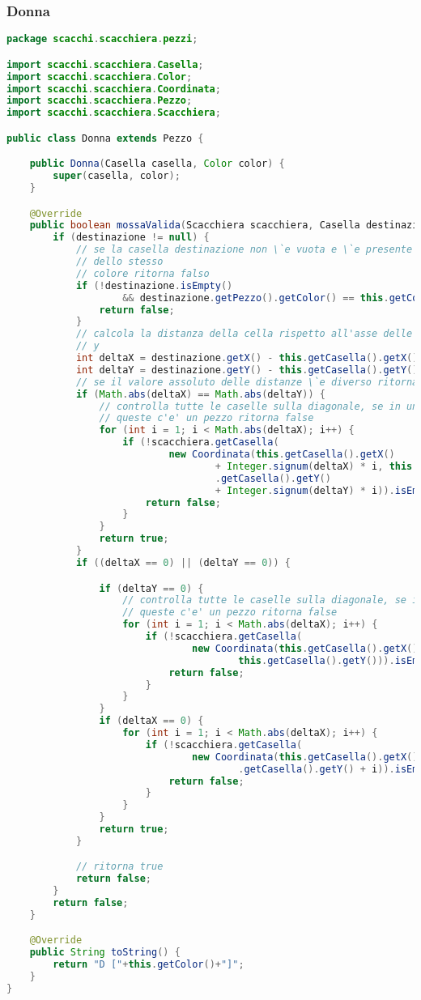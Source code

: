 \documentclass{article}
\begin{document}
\subsubsection{Donna}
\begin{lstlisting}[language=Java,escapechar=|]
package scacchi.scacchiera.pezzi;

import scacchi.scacchiera.Casella;
import scacchi.scacchiera.Color;
import scacchi.scacchiera.Coordinata;
import scacchi.scacchiera.Pezzo;
import scacchi.scacchiera.Scacchiera;

public class Donna extends Pezzo {

	public Donna(Casella casella, Color color) {
		super(casella, color);
	}

	@Override
	public boolean mossaValida(Scacchiera scacchiera, Casella destinazione) {
		if (destinazione != null) {
			// se la casella destinazione non \`e vuota e \`e presente un Pezzo
			// dello stesso
			// colore ritorna falso
			if (!destinazione.isEmpty()
					&& destinazione.getPezzo().getColor() == this.getColor()) {
				return false;
			}
			// calcola la distanza della cella rispetto all'asse delle x e delle
			// y
			int deltaX = destinazione.getX() - this.getCasella().getX();
			int deltaY = destinazione.getY() - this.getCasella().getY();
			// se il valore assoluto delle distanze \`e diverso ritorna false
			if (Math.abs(deltaX) == Math.abs(deltaY)) {
				// controlla tutte le caselle sulla diagonale, se in una di
				// queste c'e' un pezzo ritorna false
				for (int i = 1; i < Math.abs(deltaX); i++) {
					if (!scacchiera.getCasella(
							new Coordinata(this.getCasella().getX()
									+ Integer.signum(deltaX) * i, this
									.getCasella().getY()
									+ Integer.signum(deltaY) * i)).isEmpty()) {
						return false;
					}
				}
				return true;
			}
			if ((deltaX == 0) || (deltaY == 0)) {

				if (deltaY == 0) {
					// controlla tutte le caselle sulla diagonale, se in una di
					// queste c'e' un pezzo ritorna false
					for (int i = 1; i < Math.abs(deltaX); i++) {
						if (!scacchiera.getCasella(
								new Coordinata(this.getCasella().getX() + i,
										this.getCasella().getY())).isEmpty()) {
							return false;
						}
					}
				}
				if (deltaX == 0) {
					for (int i = 1; i < Math.abs(deltaX); i++) {
						if (!scacchiera.getCasella(
								new Coordinata(this.getCasella().getX(), this
										.getCasella().getY() + i)).isEmpty()) {
							return false;
						}
					}
				}
				return true;
			}

			// ritorna true
			return false;
		}
		return false;
	}

	@Override
	public String toString() {
		return "D ["+this.getColor()+"]";
	}
}
\end{lstlisting}
\end{document}
